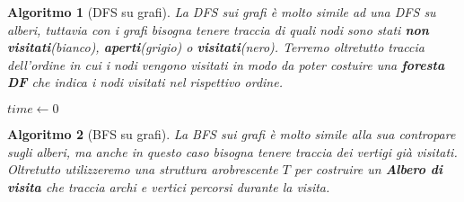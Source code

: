 \documentclass[oneside]{book}
\newtheorem{alg}{Algoritmo}
\begin{document}
\begin{alg}[DFS su grafi]
  La DFS sui grafi \`e molto simile ad una DFS su alberi, tuttavia con i grafi
  bisogna tenere traccia di quali nodi sono stati \textbf{non visitati}(bianco),
  \textbf{aperti}(grigio) o \textbf{visitati}(nero). Terremo oltretutto traccia
  dell'ordine in cui i nodi vengono visitati in modo da poter costuire una
  \textbf{foresta DF} che indica i nodi visitati nel rispettivo ordine.

  \begin{algorithm}[H]

     $time \gets 0$\;
    \;
  \end{algorithm}
\end{alg}

\begin{alg}[BFS su grafi]
  La BFS sui grafi \`e molto simile alla sua contropare sugli alberi, ma anche
  in questo caso bisogna tenere traccia dei vertigi gi\`a visitati. Oltretutto
  utilizzeremo una struttura arobrescente $T$ per costruire un \textbf{Albero
  di visita} che traccia archi e vertici percorsi durante la visita.

  \begin{algorithm}[H]
  \end{algorithm}
\end{alg}
\end{document}
